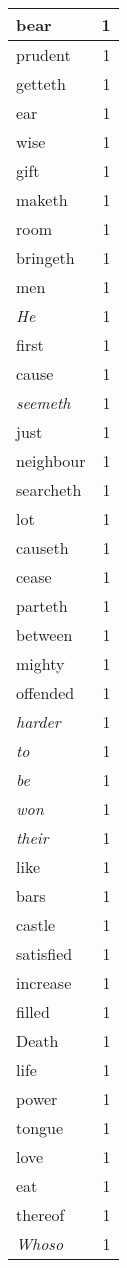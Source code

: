 \begin{center}
\begin{longtable}{l|r}
bear & 1\\ \hline 
prudent & 1\\ \hline 
getteth & 1\\ \hline 
ear & 1\\ \hline 
wise & 1\\ \hline 
gift & 1\\ \hline 
maketh & 1\\ \hline 
room & 1\\ \hline 
bringeth & 1\\ \hline 
men & 1\\ \hline 
\emph{He} & 1\\ \hline 
first & 1\\ \hline 
cause & 1\\ \hline 
\emph{seemeth} & 1\\ \hline 
just & 1\\ \hline 
neighbour & 1\\ \hline 
searcheth & 1\\ \hline 
lot & 1\\ \hline 
causeth & 1\\ \hline 
cease & 1\\ \hline 
parteth & 1\\ \hline 
between & 1\\ \hline 
mighty & 1\\ \hline 
offended & 1\\ \hline 
\emph{harder} & 1\\ \hline 
\emph{to} & 1\\ \hline 
\emph{be} & 1\\ \hline 
\emph{won} & 1\\ \hline 
\emph{their} & 1\\ \hline 
like & 1\\ \hline 
bars & 1\\ \hline 
castle & 1\\ \hline 
satisfied & 1\\ \hline 
increase & 1\\ \hline 
filled & 1\\ \hline 
Death & 1\\ \hline 
life & 1\\ \hline 
power & 1\\ \hline 
tongue & 1\\ \hline 
love & 1\\ \hline 
eat & 1\\ \hline 
thereof & 1\\ \hline 
\emph{Whoso} & 1\\ \hline 

\end{longtable}
\end{center}
